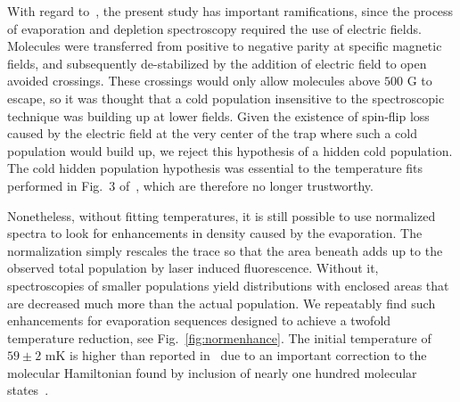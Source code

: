 \documentclass[%
 reprint,
 amsmath,amssymb,
 aps,
pra,
]{revtex4-1}
\begin{document}
With regard to~\cite{Stuhl2012evap}, the present study has important ramifications, since the process of evaporation and depletion spectroscopy required the use of electric fields. 
Molecules were transferred from positive to negative parity at specific magnetic fields, and subsequently de-stabilized by the addition of electric field to open avoided crossings.
These crossings would only allow molecules above $500\text{ G}$ to escape, so it was thought that a cold population insensitive to the spectroscopic technique was building up at lower fields.
Given the existence of spin-flip loss caused by the electric field at the very center of the trap where such a cold population would build up, we reject this hypothesis of a hidden cold population.
The cold hidden population hypothesis was essential to the temperature fits performed in Fig.~3 of~\cite{Stuhl2012evap}, which are therefore no longer trustworthy.


Nonetheless, without fitting temperatures, it is still possible to use normalized spectra to look for enhancements in density caused by the evaporation.
The normalization simply rescales the trace so that the area beneath adds up to the observed total population by laser induced fluorescence. 
Without it, spectroscopies of smaller populations yield distributions with enclosed areas that are decreased much more than the actual population.
We repeatably find such enhancements for evaporation sequences designed to achieve a twofold temperature reduction, see Fig.~\ref{fig:normenhance}.
The initial temperature of $59\pm2\text{ mK}$ is higher than reported in~\cite{Stuhl2012evap} due to an important correction to the molecular Hamiltonian found by inclusion of nearly one hundred molecular states~\cite{Maeda2015}.
\end{document}
